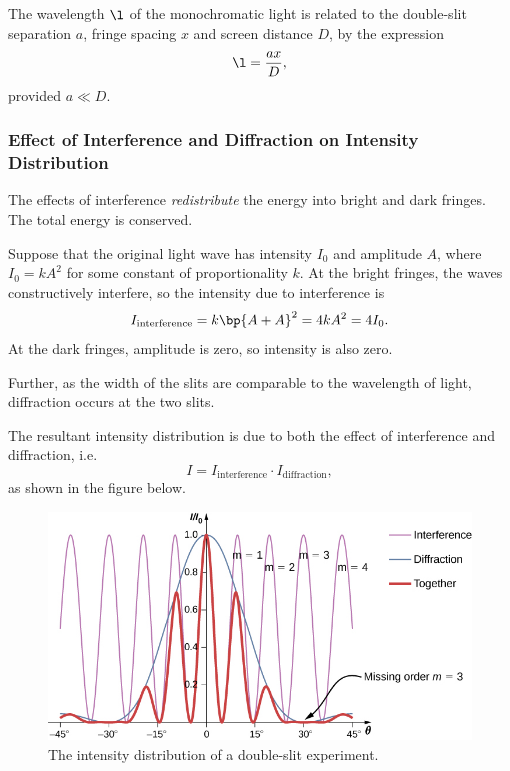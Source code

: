 \begin{proposition}
    The wavelength $\l$ of the monochromatic light is related to the double-slit separation $a$, fringe spacing $x$ and screen distance $D$, by the expression \[\l = \frac{ax}{D},\] provided $a \ll D$.
\end{proposition}

\subsubsection{Effect of Interference and Diffraction on Intensity Distribution}

The effects of interference \emph{redistribute} the energy into bright and dark fringes. The total energy is conserved.

Suppose that the original light wave has intensity $I_0$ and amplitude $A$, where $I_0 = kA^2$ for some constant of proportionality $k$. At the bright fringes, the waves constructively interfere, so the intensity due to interference is \[I_{\text{interference}} = k\bp{A + A}^2 = 4kA^2 = 4I_0.\] At the dark fringes, amplitude is zero, so intensity is also zero.

Further, as the width of the slits are comparable to the wavelength of light, diffraction occurs at the two slits.

The resultant intensity distribution is due to both the effect of interference and diffraction, i.e. \[I = I_{\text{interference}} \cdot I_{\text{diffraction}},\] as shown in the figure below.

\begin{figure}[H]
    \centering
    \includegraphics{media/Double-Slit Intensity Distribution.jpg}
    \caption{The intensity distribution of a double-slit experiment.\protect\footnotemark}
\end{figure}

